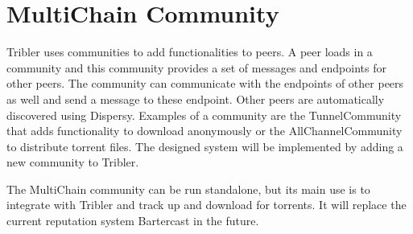 \section{MultiChain Community}
Tribler uses communities to add functionalities to peers.
A peer loads in a community and this community provides a set of messages and endpoints for other peers.
The community can communicate with the endpoints of other peers as well and send a message to these endpoint.
Other peers are automatically discovered using Dispersy.
Examples of a community are the TunnelCommunity that adds functionality to download anonymously\cite{Plak-anonymous}
or the AllChannelCommunity to distribute torrent files.
The designed system will be implemented by adding a new community to Tribler.

The MultiChain community can be run standalone,
but its main use is to integrate with Tribler and track up and download for torrents.
It will replace the current reputation system Bartercast in the future.